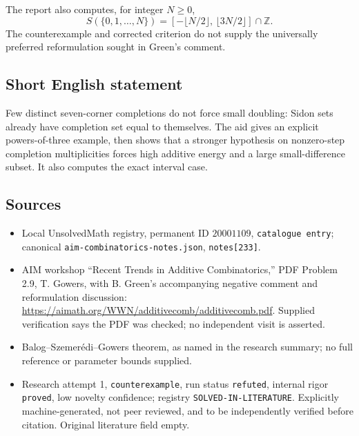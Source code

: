 \documentclass[11pt]{article}
\newcommand{\Z}{\mathbb{Z}}
\begin{document}
The report also computes, for integer $N\geq0$,
\[
 S(\{0,1,\ldots,N\})
 =[-\lfloor N/2\rfloor,\,\lfloor3N/2\rfloor]\cap\Z.
\]
The counterexample and corrected criterion do not supply the universally preferred reformulation sought in Green's comment.
\subsection{Short English statement}
Few distinct seven-corner completions do not force small doubling: Sidon sets already have completion set equal to themselves. The aid gives an explicit powers-of-three example, then shows that a stronger hypothesis on nonzero-step completion multiplicities forces high additive energy and a large small-difference subset. It also computes the exact interval case.
\subsection{Sources}
\begin{itemize}
\item Local UnsolvedMath registry, permanent ID $20001109$, \texttt{catalogue entry}; canonical \texttt{aim-combinatorics-notes.json}, \texttt{notes[233]}.
\item AIM workshop ``Recent Trends in Additive Combinatorics,'' PDF Problem 2.9, T. Gowers, with B. Green's accompanying negative comment and reformulation discussion: \url{https://aimath.org/WWN/additivecomb/additivecomb.pdf}. Supplied verification says the PDF was checked; no independent visit is asserted.
\item Balog--Szemer\'edi--Gowers theorem, as named in the research summary; no full reference or parameter bounds supplied.
\item Research attempt 1, \texttt{counterexample}, run status \texttt{refuted}, internal rigor \texttt{proved}, low novelty confidence; registry \texttt{SOLVED-IN-LITERATURE}. Explicitly machine-generated, not peer reviewed, and to be independently verified before citation. Original literature field empty.
\end{itemize}
\end{document}
